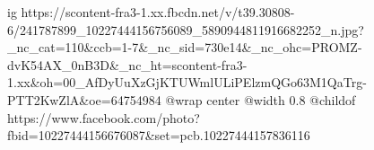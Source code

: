  
 
 
 
 

\ifcmt
  ig https://scontent-fra3-1.xx.fbcdn.net/v/t39.30808-6/241787899_10227444156756089_5890944811916682252_n.jpg?_nc_cat=110&ccb=1-7&_nc_sid=730e14&_nc_ohc=PROMZ-dvK54AX_0nB3D&_nc_ht=scontent-fra3-1.xx&oh=00_AfDyUuXzGjKTUWmlULiPElzmQGo63M1QaTrg-PTT2KwZlA&oe=64754984
  @wrap center
  @width 0.8
  @childof https://www.facebook.com/photo?fbid=10227444156676087&set=pcb.10227444157836116
\fi
